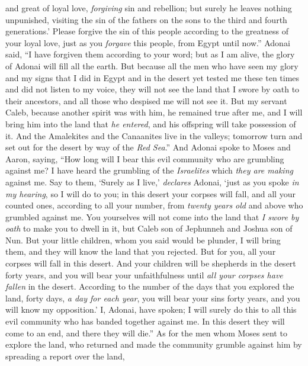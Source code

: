\begin{biblechapter}
and great of loyal love, 
\textit{forgiving} sin and rebellion; 
but surely he leaves nothing unpunished, 
visiting the sin of the fathers on the sons 
to the third and fourth generations.’
\verse Please forgive the sin of this people according to the greatness of your loyal love, just as you \textit{forgave} this people, from Egypt until now.”
\verse Adonai said, “I have forgiven them according to your word;
\verse but as I am alive, the glory of Adonai will fill all the earth.
\verse But because all the men who have seen my glory and my signs that I did in Egypt and in the desert yet tested me these ten times and did not listen to my voice,
\verse they will not see the land that I swore by oath to their ancestors, and all those who despised me will not see it.
\verse But my servant Caleb, because another spirit was with him, he remained true after me, and I will bring him into the land that \textit{he entered}, and his offspring will take possession of it.
\verse And the Amalekites and the Canaanites live in the valleys; tomorrow turn and set out for the desert by way of the \textit{Red Sea}.”
\verse And Adonai spoke to Moses and Aaron, saying,
\verse “How long will I bear this evil community who are grumbling against me? I have heard the grumbling of the \textit{Israelites} which \textit{they are making} against me.
\verse Say to them, ‘Surely as I live,’ \textit{declares} Adonai, ‘just as you spoke \textit{in my hearing}, so I will do to you;
\verse in this desert your corpses will fall, and all your counted ones, according to all your number, from \textit{twenty years old} and above who grumbled against me.
\verse You yourselves will not come into the land that \textit{I swore by oath} to make you to dwell in it, but Caleb son of Jephunneh and Joshua son of Nun.
\verse But your little children, whom you said would be plunder, I will bring them, and they will know the land that you rejected.
\verse But for you, all your corpses will fall in this desert.
\verse And your children will be shepherds in the desert forty years, and you will bear your unfaithfulness until \textit{all your corpses have fallen} in the desert.
\verse According to the number of the days that you explored the land, forty days, \textit{a day for each year}, you will bear your sins forty years, and you will know my opposition.’
\verse I, Adonai, have spoken; I will surely do this to all this evil community who has banded together against me. In this desert they will come to an end, and there they will die.”
\verse As for the men whom Moses sent to explore the land, who returned and made the community grumble against him by spreading a report over the land,

\end{biblechapter}
